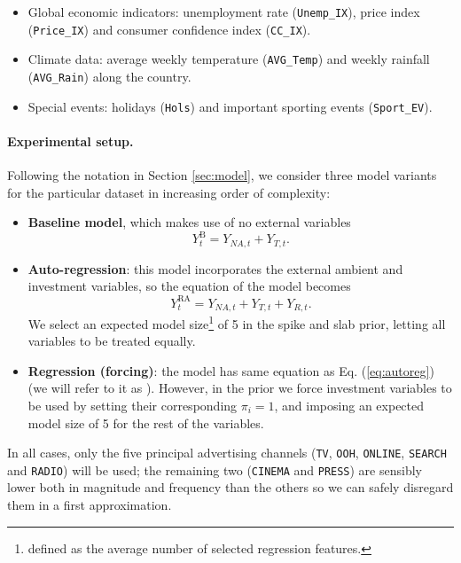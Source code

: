 \begin{itemize}
\item Global economic indicators: unemployment rate (\texttt{Unemp\_IX}), price index (\texttt{Price\_IX}) and consumer confidence index (\texttt{CC\_IX}).
\item Climate data: average weekly temperature (\texttt{AVG\_Temp}) and weekly rainfall (\texttt{AVG\_Rain}) along the country.
\item Special events: holidays (\texttt{Hols}) and important sporting events (\texttt{Sport\_EV}).
\end{itemize}

\paragraph{Experimental setup.}

Following the notation in Section \ref{sec:model}, we consider three model variants for the particular dataset in increasing order of complexity:


\begin{itemize}
\item \textbf{Baseline model}, which makes use of no external variables $$Y^{\text{B}}_t = Y_{NA,t} + Y_{T, t}.$$
\item \textbf{Auto-regression}: this model  incorporates the external ambient and investment variables, so the equation of the model becomes 
\begin{equation}\label{eq:autoreg}
Y_t^{\text{RA}} = Y_{NA,t} + Y_{T, t} + Y_{R,t}.
\end{equation}
We select an expected model size\footnote{defined as the average number of selected regression features.} of 5 in the spike and slab prior, letting all variables to be treated equally.
\item \textbf{Regression (forcing)}: the model has same equation as Eq. (\ref{eq:autoreg}) (we will refer to it as ).
However, in the prior we force investment variables to be used by setting their corresponding $\pi_i = 1$, and imposing an expected model size of 5 for the rest of the variables.
\end{itemize}
In all cases, only the five principal advertising channels (\texttt{TV}, \texttt{OOH}, \texttt{ONLINE}, \texttt{SEARCH} and \texttt{RADIO}) will be used; the remaining two (\texttt{CINEMA} and \texttt{PRESS}) are sensibly lower both in magnitude and frequency than the others so we can safely disregard them in a first approximation. 


